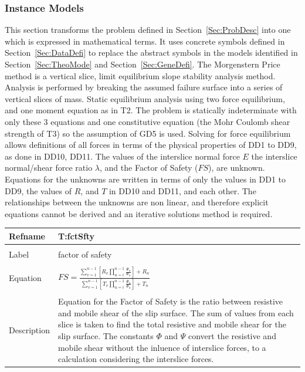 \documentclass[12pt]{article}
\begin{document}
\subsubsection{Instance Models}
\label{Sec:InstMode}
This section transforms the problem defined in Section~\ref{Sec:ProbDesc} into one which is expressed in mathematical terms. It uses concrete symbols defined in Section~\ref{Sec:DataDefi} to replace the abstract symbols in the models identified in Section~\ref{Sec:TheoMode} and Section~\ref{Sec:GeneDefi}.
The Morgenstern Price method is a vertical slice, limit equilibrium slope stability analysis method. Analysis is performed by breaking the assumed failure surface into a series of vertical slices of mass. Static equilibrium analysis using two force equilibrium, and one moment equation as in T2. The problem is statically indeterminate with only these 3 equations and one constitutive equation (the Mohr Coulomb shear strength of T3) so the assumption of GD5 is used. Solving for force equilibrium allows definitions of all forces in terms of the physical properties of DD1 to DD9, as done in DD10, DD11.
The values of the interslice normal force $E$ the interslice normal/shear force ratio $\lambda{}$, and the Factor of Safety ($FS$), are unknown. Equations for the unknowns are written in terms of only the values in DD1 to DD9, the values of $R$, and $T$ in DD10 and DD11, and each other. The relationships between the unknowns are non linear, and therefore explicit equations cannot be derived and an iterative solutions method is required.
~\newline
\noindent \begin{minipage}{\textwidth}
\begin{tabular}{p{} p{}}
\toprule \textbf{Refname} & \textbf{T:fctSfty}
\label{T:fctSfty}
\\ \midrule \\
Label & factor of safety
\\ \midrule \\
Equation & $FS=\frac{\displaystyle\sum_{v=1}^{n-1}{\left[R_{v}\displaystyle\prod_{u=i}^{n-1}{\frac{\Psi{}_{u}}{\Phi{}_{u}}}\right]}+R_{n}}{\displaystyle\sum_{v=1}^{n-1}{\left[T_{v}\displaystyle\prod_{u=i}^{n-1}{\frac{\Psi{}_{u}}{\Phi{}_{u}}}\right]}+T_{n}}$
\\ \midrule \\
Description & Equation for the Factor of Safety is the ratio between resistive and mobile shear of the slip surface. The sum of values from each slice is taken to find the total resistive and mobile shear for the slip surface. The constants $\Phi{}$ and $\Psi{}$ convert the resistive and mobile shear without the inluence of interslice forces, to a calculation considering the interslice forces.
\\ \bottomrule \end{tabular}
\end{minipage}\\
\end{document}

